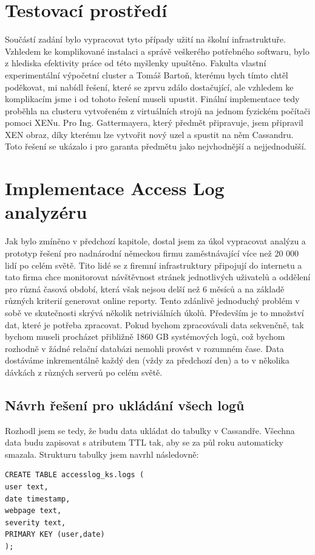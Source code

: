 \section{Testovací prostředí}
Součástí zadání bylo vypracovat tyto případy užití na školní infrastruktuře. Vzhledem ke komplikované instalaci a správě veškerého potřebného softwaru, bylo z hlediska efektivity práce od této myšlenky upuštěno. Fakulta vlastní experimentální výpočetní cluster a Tomáš Bartoň, kterému bych tímto chtěl poděkovat, mi nabídl řešení, které se zprvu zdálo dostačující, ale vzhledem ke komplikacím jsme i od tohoto řešení museli upustit. Finální implementace tedy proběhla na clusteru vytvořeném z virtuálních strojů na jednom fyzickém počítači pomoci XENu. Pro Ing. Gattermayera, který předmět připravuje, jsem připravil XEN obraz, díky kterému lze vytvořit nový uzel a spustit na něm Cassandru. Toto řešení se ukázalo i pro garanta předmětu jako nejvhodnější a nejjednodušší. 

\section{Implementace Access Log analyzéru}
Jak bylo zmíněno v předchozí kapitole, dostal jsem za úkol vypracovat analýzu a prototyp řešení pro nadnárodní německou firmu zaměstnávající více než 20 000 lidí po celém světě. Tito lidé se z firemní infrastruktury připojují do internetu a tato firma chce monitorovat návštěvnost stránek jednotlivých uživatelů a oddělení pro různá časová období, která však nejsou delší než 6 měsíců a na základě různých kriterií generovat online reporty. Tento zdánlivě jednoduchý problém v sobě ve skutečnosti skrývá několik netriviálních úkolů. Především je to množství dat, které je potřeba zpracovat. Pokud bychom zpracovávali data sekvenčně, tak bychom museli procházet přibližně 1860 GB systémových logů, což bychom rozhodně v žádné relační databázi nemohli provést v rozumném čase. Data dostáváme inkrementálně každý den (vždy za předchozí den) a to v několika dávkách z různých serverů po celém světě. 


\subsection{Návrh řešení pro ukládání všech logů}
Rozhodl jsem se tedy, že budu data ukládat do tabulky v Cassandře. Všechna data budu zapisovat s atributem TTL tak, aby se za půl roku automaticky smazala. Strukturu tabulky jsem navrhl následovně: 

\begin{lstlisting}[caption={Návrh tabulky pro ukládání všech logů},label=LogTable]
CREATE TABLE accesslog_ks.logs ( 
user text,
date timestamp,
webpage text,
severity text,
PRIMARY KEY (user,date) 
);
\end{lstlisting}

